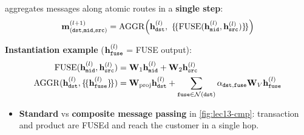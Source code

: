 \begin{definition}\label{def:lec13-cmp}
   aggregates messages along atomic routes in a
  \textbf{single step}:
  \begin{equation}\label{eq:lec13-cmp}
    \mathbf{m}^{(l+1)}_{(\mathtt{dst},\mathtt{mid},\mathtt{src})}
    =\mathrm{AGGR}\Big(\mathbf{h}^{(l)}_{\mathtt{dst}},\
      \{\!\{\mathrm{FUSE}(\mathbf{h}^{(l)}_{\mathtt{mid}},\mathbf{h}^{(l)}_{\mathtt{src}})\}\!\}\Big)
  \end{equation}
\end{definition}
\textbf{Instantiation example} ($\mathbf{h}^{(l)}_{\mathtt{fuse}}$ = FUSE output):
\begin{align}
  \mathrm{FUSE}(\mathbf{h}^{(l)}_{\mathtt{mid}},\mathbf{h}^{(l)}_{\mathtt{src}})
    &=\mathbf{W}_1\mathbf{h}^{(l)}_{\mathtt{mid}}+\mathbf{W}_2\mathbf{h}^{(l)}_{\mathtt{src}}
    \label{eq:lec13-fuse}\\
  \mathrm{AGGR}(\mathbf{h}^{(l)}_{\mathtt{dst}},\{\!\{\mathbf{h}^{(l)}_{\mathtt{fuse}}\}\!\})
    &=\mathbf{W}_{\mathrm{proj}}\mathbf{h}^{(l)}_{\mathtt{dst}}
      +\sum_{\mathtt{fuse}\in\mathcal{N}(\mathtt{dst})}
       \alpha_{\mathtt{dst},\mathtt{fuse}}\mathbf{W}_V\mathbf{h}^{(l)}_{\mathtt{fuse}}
    \label{eq:lec13-aggr}
\end{align}
\begin{itemize}
  \item \textbf{Standard} vs \textbf{composite message passing} in
    \cref{fig:lec13-cmp}: transaction and product are FUSEd and reach the customer in a
    single hop.
\end{itemize}

